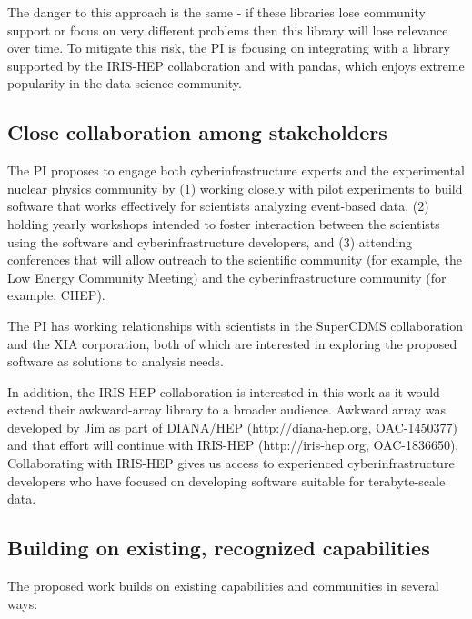 The danger to this approach is the same - if these libraries lose community support or focus on very different problems then this library will lose relevance over time.  To mitigate this risk, the PI is focusing on integrating with a library supported by the IRIS-HEP collaboration and with pandas, which enjoys extreme popularity in the data science community.

\subsection{Close collaboration among stakeholders}

The PI proposes to engage both cyberinfrastructure experts and the experimental nuclear physics community by (1) working closely with pilot experiments to build software that works effectively for scientists analyzing event-based data, (2) holding yearly workshops intended to foster interaction between the scientists using the software and cyberinfrastructure developers, and (3) attending conferences that will allow outreach to the scientific community (for example, the Low Energy Community Meeting) and the cyberinfrastructure community (for example, CHEP).

The PI has working relationships with scientists in the SuperCDMS collaboration and the XIA corporation, both of which are interested in exploring the proposed software as solutions to analysis needs.

In addition, the IRIS-HEP collaboration is interested in this work as it would extend their awkward-array library to a broader audience.  Awkward array was developed by Jim as part of DIANA/HEP (http://diana-hep.org,
OAC-1450377) and that effort will continue with IRIS-HEP
(http://iris-hep.org, OAC-1836650).  Collaborating with IRIS-HEP gives us access to experienced cyberinfrastructure developers who have focused on developing software suitable for terabyte-scale data.


\subsection{Building on existing, recognized capabilities}

The proposed work builds on existing capabilities and communities in several ways:

